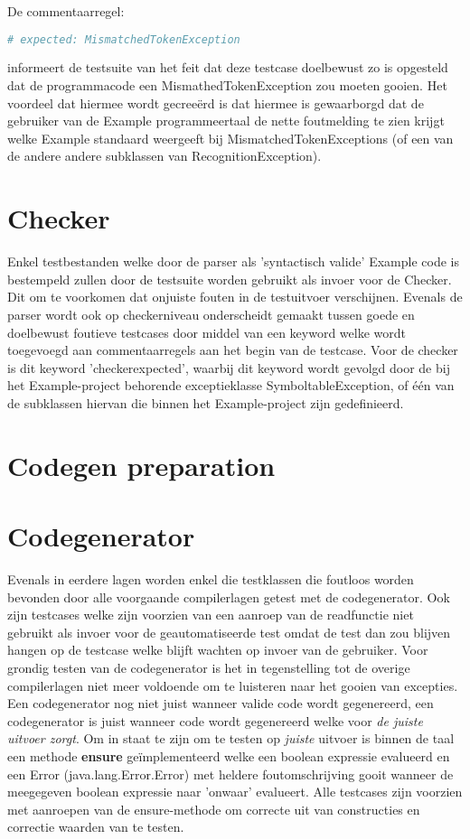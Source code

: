 De commentaarregel:
\begin{lstlisting}[language=Python]
# expected: MismatchedTokenException
\end{lstlisting}
informeert de testsuite van het feit dat deze testcase doelbewust zo is opgesteld dat de programmacode een MismathedTokenException zou moeten gooien. Het voordeel dat hiermee wordt gecree\"{e}rd is dat hiermee is gewaarborgd dat de gebruiker van de Example programmeertaal de nette foutmelding te zien krijgt welke Example standaard weergeeft bij MismatchedTokenExceptions (of een van de andere andere subklassen van RecognitionException).

\section{Checker}
Enkel testbestanden welke door de parser als 'syntactisch valide' Example code is bestempeld zullen door de testsuite worden gebruikt als invoer voor de Checker. Dit om te voorkomen dat onjuiste fouten in de testuitvoer verschijnen. Evenals de parser wordt ook op checkerniveau onderscheidt gemaakt tussen goede en doelbewust foutieve testcases door middel van een keyword welke wordt toegevoegd aan commentaarregels aan het begin van de testcase. Voor de checker is dit keyword 'checkerexpected', waarbij dit keyword wordt gevolgd door de bij het Example-project behorende exceptieklasse SymboltableException, of \'{e}\'{e}n van de subklassen hiervan die binnen het Example-project zijn gedefinieerd.

\section{Codegen preparation}

\section{Codegenerator}
Evenals in eerdere lagen worden enkel die testklassen die foutloos worden bevonden door alle voorgaande compilerlagen getest met de codegenerator. Ook zijn testcases welke zijn voorzien van een aanroep van de readfunctie niet gebruikt als invoer voor de geautomatiseerde test omdat de test dan zou blijven hangen op de testcase welke blijft wachten op invoer van de gebruiker. Voor grondig testen van de codegenerator is het in tegenstelling tot de overige compilerlagen niet meer voldoende om te luisteren naar het gooien van excepties. Een codegenerator nog niet juist wanneer valide code wordt gegenereerd, een codegenerator is juist wanneer code wordt gegenereerd welke voor \emph{de juiste uitvoer zorgt}. Om in staat te zijn om te testen op \emph{juiste} uitvoer is binnen de taal een methode \textbf{ensure} ge\"{i}mplementeerd welke een boolean expressie evalueerd en een Error (java.lang.Error.Error) met heldere foutomschrijving gooit wanneer de meegegeven boolean expressie naar 'onwaar' evalueert. Alle testcases zijn voorzien met aanroepen van de ensure-methode om correcte uit van constructies en correctie waarden van te testen.
